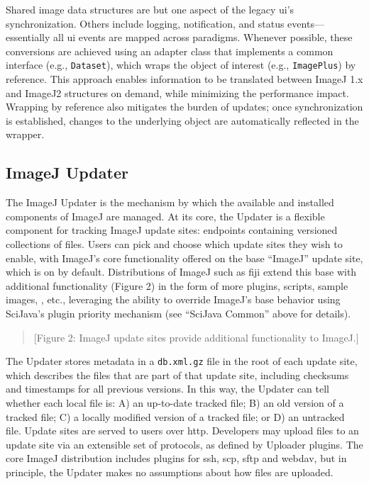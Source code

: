 \documentclass{bmcart}
\begin{document}
Shared image data structures are but one aspect of the legacy \acrshort{ui}'s
synchronization. Others include logging, notification, and status
events---essentially all \acrshort{ui} events are mapped across paradigms.
Whenever possible, these conversions are achieved using an adapter class that
implements a common interface (e.g., \texttt{Dataset}), which wraps the object
of interest (e.g., \texttt{ImagePlus}) by reference. This approach enables
information to be translated between ImageJ 1.x and ImageJ2 structures on
demand, while minimizing the performance impact. Wrapping by reference also
mitigates the burden of updates; once synchronization is established, changes
to the underlying object are automatically reflected in the wrapper.

\subsection*{ImageJ Updater}
The ImageJ Updater is the mechanism by which the available and installed
components of ImageJ are managed. At its core, the Updater is a flexible
component for tracking ImageJ update sites: endpoints containing versioned
collections of files. Users can pick and choose which update sites they wish to
enable, with ImageJ's core functionality offered on the base ``ImageJ'' update
site, which is on by default. Distributions of ImageJ such as \acrfull{fiji}
\cite{fiji} extend this base with additional functionality (Figure 2) in the
form of more plugins, scripts, sample images, , etc., leveraging
the ability to override ImageJ's base behavior using SciJava's plugin priority
mechanism (see ``SciJava Common'' above for details).

\begin{quote}
[Figure 2: ImageJ update sites provide additional functionality to ImageJ.]
\end{quote}

The Updater stores metadata in a \texttt{db.xml.gz} file in the root of each
update site, which describes the files that are part of that update site,
including checksums and timestamps for all previous versions. In this way, the
Updater can tell whether each local file is: A) an up-to-date tracked file; B)
an old version of a tracked file; C) a locally modified version of a tracked
file; or D) an untracked file. Update sites are served to users over
\acrfull{http}. Developers may upload files to an update site via an extensible
set of protocols, as defined by Uploader plugins. The core ImageJ distribution
includes plugins for \acrfull{ssh}, \acrfull{scp}, \acrfull{sftp} and
\acrfull{webdav}, but in principle, the Updater makes no assumptions about how
files are uploaded.
\end{document}
